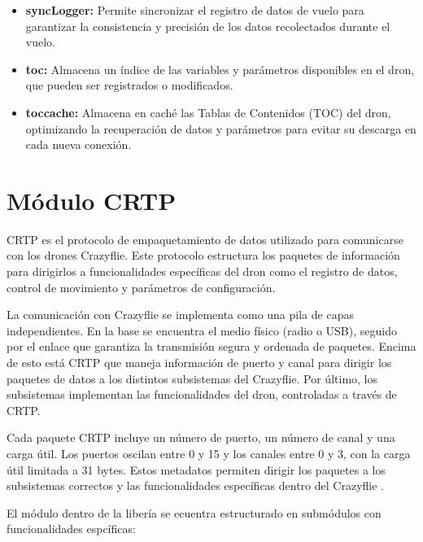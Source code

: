 \begin{itemize}
\begin{itemize}
		\item \textbf{syncLogger:} Permite sincronizar el registro de datos de vuelo para garantizar la consistencia y precisión de los datos recolectados durante el vuelo.
		
		\item \textbf{toc:} Almacena un índice de las variables y parámetros disponibles en el dron, que pueden ser registrados o modificados.
		
		\item \textbf{toccache:} Almacena en caché las Tablas de Contenidos (TOC) del dron, optimizando la recuperación de datos y parámetros para evitar su descarga en cada nueva conexión.
	\end{itemize}
\end{itemize}

\newpage
\section{Módulo CRTP}
CRTP es el protocolo de empaquetamiento de datos utilizado para comunicarse con los drones Crazyflie. Este protocolo estructura los paquetes de información para dirigirlos a funcionalidades específicas del dron como el registro de datos, control de movimiento y parámetros de configuración.
 
La comunicación con Crazyflie se implementa como una pila de capas independientes. En la base se encuentra el medio físico (radio o USB), seguido por el enlace que garantiza la transmisión segura y ordenada de paquetes. Encima de esto está CRTP que maneja información de puerto y canal para dirigir los paquetes de datos a los distintos subsistemas del Crazyflie. Por último, los subsistemas implementan las funcionalidades del dron, controladas a través de CRTP.

Cada paquete CRTP incluye un número de puerto, un número de canal y una carga útil. Los puertos oscilan entre 0 y 15 y los canales entre 0 y 3, con la carga útil limitada a 31 bytes. Estos metadatos permiten dirigir los paquetes a los subsistemas correctos y las funcionalidades específicas dentro del Crazyflie \cite{Crazyflie_CRTP}.

El módulo dentro de la libería se ecuentra estructurado en submódulos con funcionalidades espcíficas:

